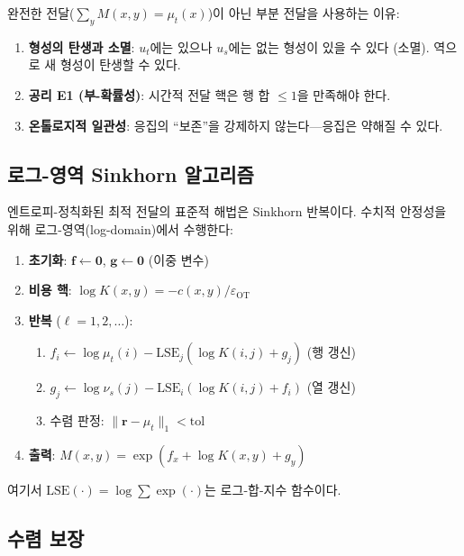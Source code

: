 완전한 전달($\sum_y M(x,y) = \mu_t(x)$)이 아닌 부분 전달을 사용하는 이유:

\begin{enumerate}
    \item \textbf{형성의 탄생과 소멸}: $u_t$에는 있으나 $u_s$에는 없는 형성이 있을 수 있다 (소멸). 역으로 새 형성이 탄생할 수 있다.
    \item \textbf{공리 E1 (부-확률성)}: 시간적 전달 핵은 행 합 $\leq 1$을 만족해야 한다.
    \item \textbf{온톨로지적 일관성}: 응집의 ``보존''을 강제하지 않는다---응집은 약해질 수 있다.
\end{enumerate}

\subsection{로그-영역 Sinkhorn 알고리즘}

엔트로피-정칙화된 최적 전달의 표준적 해법은 Sinkhorn 반복이다. 수치적 안정성을 위해 로그-영역(log-domain)에서 수행한다:

\begin{algorithm}[H]
\caption{로그-영역 Sinkhorn 반복}
\label{alg:sinkhorn}
\begin{enumerate}
    \item \textbf{초기화}: $\mathbf{f} \leftarrow \mathbf{0}$, $\mathbf{g} \leftarrow \mathbf{0}$ (이중 변수)
    \item \textbf{비용 핵}: $\log K(x,y) = -c(x,y) / \varepsilon_{\mathrm{OT}}$
    \item \textbf{반복} ($\ell = 1, 2, \ldots$):
    \begin{enumerate}
        \item $f_i \leftarrow \log \mu_t(i) - \mathrm{LSE}_j(\log K(i,j) + g_j)$ \quad (행 갱신)
        \item $g_j \leftarrow \log \nu_s(j) - \mathrm{LSE}_i(\log K(i,j) + f_i)$ \quad (열 갱신)
        \item 수렴 판정: $\|\mathbf{r} - \mu_t\|_1 < \mathrm{tol}$
    \end{enumerate}
    \item \textbf{출력}: $M(x,y) = \exp(f_x + \log K(x,y) + g_y)$
\end{enumerate}
여기서 $\mathrm{LSE}(\cdot) = \log \sum \exp(\cdot)$는 로그-합-지수 함수이다.
\end{algorithm}

\subsection{수렴 보장}

